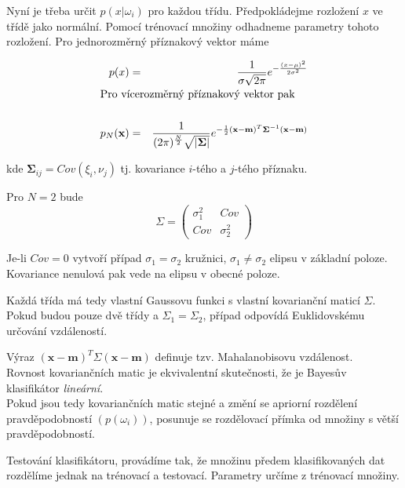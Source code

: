 Nyní je třeba určit $p(x|\omega_i)$ pro každou třídu. Předpokládejme rozložení $x$ ve třídě jako normální. Pomocí
trénovací množiny odhadneme parametry tohoto rozložení. Pro jednorozměrný příznakový vektor máme

\def\x{\mathbf{x}}
\def\m{\mathbf{m}}
\def\bSigma{\mathbf{\Sigma}}

\begin{eqnarray}
p(x)&=&\frac{1}{\sigma \sqrt{2\pi}}e^{-\frac{(x-\mu)^2}{2\sigma^2}}\\
\noalign{\hbox{Pro vícerozměrný příznakový vektor pak}\nonumber}\\
p_N(\x)&=&\frac{1}{(2\pi)^\frac{N}{2}\sqrt{|\bSigma|}}e^{-\frac{1}{2}(\x-\m)^T\bSigma^{-1}(\x-\m)}
\end{eqnarray}

kde $\bSigma_{ij}=Cov(\xi_i,\nu_j)$ tj. kovariance $i$-tého a $j$-tého příznaku.

Pro $N=2$ bude
$$
\Sigma=\left(\begin{array}{cc}\sigma_1^2 & Cov\\ Cov & \sigma_2^2\end{array}\right)
$$

Je-li $Cov=0$ vytvoří případ $\sigma_1=\sigma_2$ kružnici, $\sigma_1\neq\sigma_2$ elipsu v základní poloze.
Kovariance nenulová pak vede na elipsu v obecné poloze.

Každá třída má tedy vlastní Gaussovu funkci s vlastní kovarianční maticí $\Sigma$.
Pokud budou pouze dvě třídy a $\Sigma_1=\Sigma_2$, případ odpovídá Euklidovskému určování vzdáleností.

 Výraz $(\x-\m)^T\Sigma(\x-\m)$ definuje tzv. Mahalanobisovu vzdálenost.\\
Rovnost kovariančních matic je ekvivalentní skutečnosti, že je Bayesův klasifikátor {\em lineární}.\\
Pokud jsou tedy kovariančních matic stejné a změní se apriorní rozdělení 
pravděpodobností $(p(\omega_i))$, posunuje se rozdělovací přímka od množiny s větší pravděpodobností.


Testování klasifikátoru, provádíme tak, že množinu předem klasifikovaných dat rozdělíme jednak na trénovací a
testovací. Parametry určíme z trénovací množiny.

